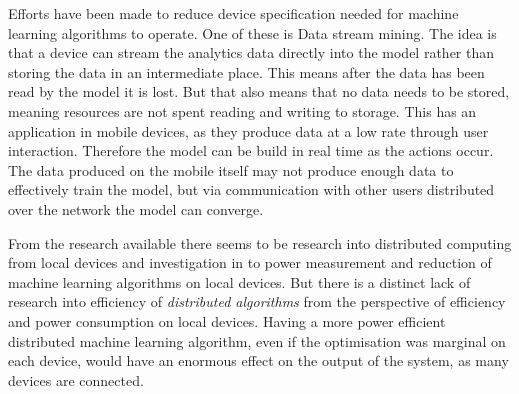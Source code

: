 Efforts have been made to reduce device specification needed for machine learning
algorithms to operate. One of these is Data stream mining. The idea is that a
device can stream the analytics data directly into the model rather than storing
the data in an intermediate place. \cite{garciaMartin2019MLEnergy} This means
after the data has been read by the model it is lost. But that also means that
no data needs to be stored, meaning resources are not spent reading and writing
to storage. This has an application in mobile devices, as they produce data at a
low rate through user interaction. Therefore the model can be build in real time
as the actions occur. The data produced on the mobile itself may not produce
enough data to effectively train the model, but via communication with other
users distributed over the network the model can converge.

From the research available there seems to be research into distributed
computing from local devices and investigation in to power measurement
\cite{wang2018EdgeLearning, konevcny2016federated} and reduction of machine
learning algorithms on local devices. \cite{garciaMartin2019MLEnergy} But there
is a distinct lack of research into efficiency of \textit{distributed algorithms} from
the perspective of efficiency and power consumption on local devices. Having a
more power efficient distributed machine learning algorithm, even if the
optimisation was marginal on each device, would have an enormous effect on the
output of the system, as many devices are connected.

